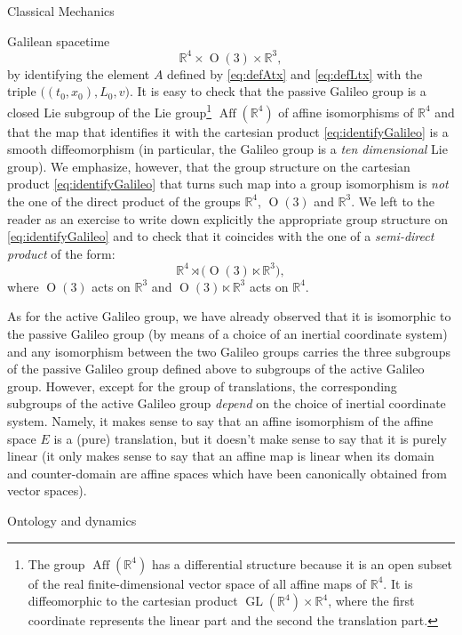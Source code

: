 \documentclass[oneside,a4paper,11pt]{amsbook}
\newcommand{\R}{\mathds R}
\DeclareMathOperator{\Aff}{Aff}
\DeclareMathOperator{\GL}{GL}
\DeclareMathOperator{\Or}{O}
\theoremstyle{remark}\newtheorem{exercise}{Exercise}[chapter]
\theoremstyle{plain}\newtheorem{teo}{Theorem}[section]
\theoremstyle{plain}\newtheorem{lem}[teo]{Lemma}
\theoremstyle{plain}\newtheorem{prop}[teo]{Proposition}
\theoremstyle{plain}\newtheorem{cor}[teo]{Corollary}
\theoremstyle{definition}\newtheorem{defin}[teo]{Definition}
\theoremstyle{remark}\newtheorem{rem}[teo]{Remark}
\theoremstyle{definition}\newtheorem{notation}[teo]{Notation}
\theoremstyle{definition}\newtheorem{convention}[teo]{Convention}
\theoremstyle{definition}\newtheorem{example}[teo]{Example}
\numberwithin{section}{chapter}
\numberwithin{equation}{section}
\begin{document}
\begin{chapter}{Classical Mechanics}
\begin{section}{Galilean spacetime}
\begin{equation}
\R^4\times\Or(3)\times\R^3,
\end{equation}
by identifying the element $A$ defined by \eqref{eq:defAtx} and \eqref{eq:defLtx} with the triple
$\big((t_0,x_0),L_0,v\big)$. It is easy to check that the passive Galileo group is a closed Lie subgroup of the Lie
group\footnote{%
The group $\Aff(\R^4)$ has a differential structure because it is an open subset of the real finite-dimensional vector
space of all affine maps of $\R^4$. It is diffeomorphic to the cartesian product $\GL(\R^4)\times\R^4$, where the first
coordinate represents the linear part and the second the translation part.}
$\Aff(\R^4)$ of affine isomorphisms of $\R^4$ and that the map that identifies it with the cartesian product
\eqref{eq:identifyGalileo} is a smooth diffeomorphism (in particular, the Galileo group is a {\em ten dimensional\/} Lie group).
We emphasize, however, that the group structure on the cartesian
product \eqref{eq:identifyGalileo} that turns such map into a group isomorphism is {\em not\/} the one of the direct product
of the groups $\R^4$, $\Or(3)$ and $\R^3$. We left to the reader as an exercise to write down explicitly the appropriate
group structure on \eqref{eq:identifyGalileo} and to check that it coincides with the one of a {\em semi-direct product\/}
of the form:
\[\R^4\rtimes\big(\!\Or(3)\ltimes\R^3\big),\]
where $\Or(3)$ acts on $\R^3$ and $\Or(3)\ltimes\R^3$ acts on $\R^4$.

As for the active Galileo group, we have already observed that it is isomorphic to the passive Galileo group (by means
of a choice of an inertial coordinate system) and any
isomorphism between the two Galileo groups carries the three subgroups of the passive Galileo group defined above to subgroups of the
active Galileo group. However, except for the group of translations, the corresponding subgroups of the active
Galileo group {\em depend\/} on the choice of inertial coordinate system. Namely, it makes sense to say that
an affine isomorphism of the affine space $E$ is a (pure) translation, but it doesn't make sense to say that
it is purely linear (it only makes sense to say that an affine map is linear when its domain and counter-domain
are affine spaces which have been canonically obtained from vector spaces).

\end{section}

\begin{section}{Ontology and dynamics}
\label{sec:ontologydynamics}


\end{section}
\end{chapter}
\end{document}

